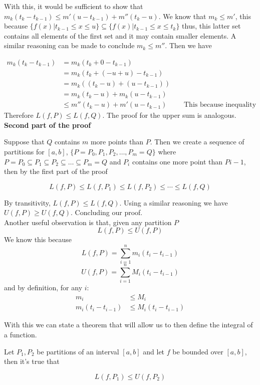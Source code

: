 \documentclass{report}
\begin{document}
    With this, it would be sufficient to show that $m_k(t_k-t_{k-1}) \leq m'(u - t_{k-1}) + m''(t_k-u)$. We know that $m_k \leq m'$, this because $\{f(x) | t_{k-1} \leq x \leq u\} \subseteq \{f(x) | t_{k-1} \leq x \leq t_k\}$ thus, this latter set contains all elements of the first set and it may contain smaller elements. A similar reasoning can be made to conclude $m_k \leq m''$. Then we have

    \begin{align*}
        m_k(t_k-t_{k-1}) &= m_k(t_k+0-t_{k-1})\\
        &= m_k(t_k+(-u+u)-t_{k-1})\\
        &= m_k((t_k-u)+(u-t_{k-1}))\\
        &= m_k(t_k-u)+m_k(u-t_{k-1})\\
        &\leq m''(t_k-u) + m'(u-t_{k-1}) &&\text{ This because inequality properties.}
    \end{align*}
    Therefore $L(f,P) \leq L(f, Q)$. The proof for the upper sum is analogous.\\

    \noindent\textbf{Second part of the proof}

    Suppose that $Q$ contains $m$ more points than $P$. Then we create a sequence of partitions for $[a,b]$, $\{P = P_0, P_1, P_2, \dots , P_m = Q\}$ where $P = P_0 \subseteq P_1 \subseteq P_2 \subseteq \dots \subseteq P_m = Q$ and $P_i$ contains one more point than $P{i-1}$, then by the first part of the proof

    $$L(f,P) \leq L(f,P_1) \leq L(f,P_2) \leq \cdots \leq L(f,Q)$$

    By transitivity, $L(f,P) \leq L(f,Q)$. Using a similar reasoning we have $U(f,P) \geq U(f,Q)$. Concluding our proof.
    \\

    Another useful observation is that, given any partition $P$
    $$L(f, P) \leq U(f, P)$$
    We know this because
    $$L(f, P) = \sum_{i=1}^{n}m_i(t_{i} - t_{i-1})$$
    $$U(f, P) = \sum_{i=1}^{n}M_i(t_{i} - t_{i-1})$$
    and by definition, for any $i$:
    \begin{align*}
        m_i &\leq M_i\\
        m_i(t_{i} - t_{i-1}) &\leq M_i(t_{i} - t_{i-1})
    \end{align*}

    With this we can state a theorem that will allow us to then define the integral of a function.

    \begin{thBox}
        Let $P_1, P_2$ be partitions of an interval $[a,b]$ and let $f$ be bounded over $[a,b]$, then it's true that

        $$L(f, P_1) \leq U(f, P_2)$$
    \end{thBox}
\end{document}
